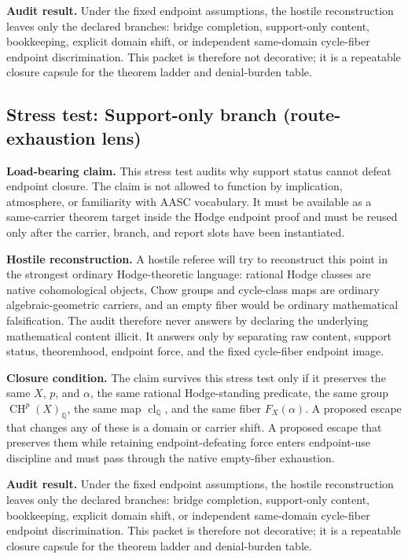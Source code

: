 \documentclass[11pt]{article}
\newcommand{\QQ}{\mathbb{Q}}
\newcommand{\CH}{\operatorname{CH}}
\newcommand{\clQ}{\operatorname{cl}_{\QQ}}
\begin{document}
\par\noindent\textbf{Audit result.} Under the fixed endpoint assumptions, the hostile reconstruction leaves only the declared branches: bridge completion, support-only content, bookkeeping, explicit domain shift, or independent same-domain cycle-fiber endpoint discrimination. This packet is therefore not decorative; it is a repeatable closure capsule for the theorem ladder and denial-burden table.


\subsection{Stress test: Support-only branch (route-exhaustion lens)}

\par\noindent\textbf{Load-bearing claim.} This stress test audits why support status cannot defeat endpoint closure. The claim is not allowed to function by implication, atmosphere, or familiarity with AASC vocabulary. It must be available as a same-carrier theorem target inside the Hodge endpoint proof and must be reused only after the carrier, branch, and report slots have been instantiated.

\par\noindent\textbf{Hostile reconstruction.} A hostile referee will try to reconstruct this point in the strongest ordinary Hodge-theoretic language: rational Hodge classes are native cohomological objects, Chow groups and cycle-class maps are ordinary algebraic-geometric carriers, and an empty fiber would be ordinary mathematical falsification. The audit therefore never answers by declaring the underlying mathematical content illicit. It answers only by separating raw content, support status, theoremhood, endpoint force, and the fixed cycle-fiber endpoint image.

\par\noindent\textbf{Closure condition.} The claim survives this stress test only if it preserves the same $X$, $p$, and $\alpha$, the same rational Hodge-standing predicate, the same group $\CH^p(X)_\QQ$, the same map $\clQ$, and the same fiber $F_X(\alpha)$. A proposed escape that changes any of these is a domain or carrier shift. A proposed escape that preserves them while retaining endpoint-defeating force enters endpoint-use discipline and must pass through the native empty-fiber exhaustion.

\par\noindent\textbf{Audit result.} Under the fixed endpoint assumptions, the hostile reconstruction leaves only the declared branches: bridge completion, support-only content, bookkeeping, explicit domain shift, or independent same-domain cycle-fiber endpoint discrimination. This packet is therefore not decorative; it is a repeatable closure capsule for the theorem ladder and denial-burden table.
\end{document}
